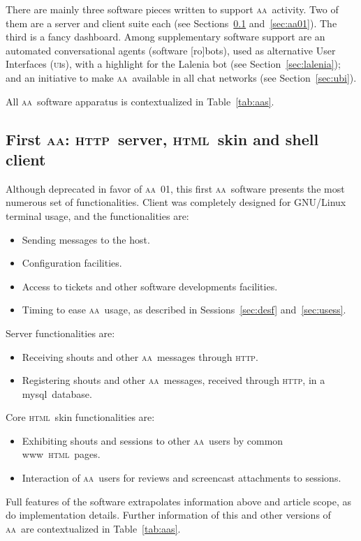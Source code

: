 \documentclass[a4paper, 11pt]{article} %
\newcommand{\httpb}{\textsc{http}}
\newcommand{\html}{\textsc{html}}
\newcommand{\aab}{\textsc{aa}}
\newcommand{\www}{{\sc www}}
\newcommand{\mysql}{{\sc m}y{\sc sql}}
\newcommand{\ui}{\textsc{ui}}
\begin{document}
There are mainly three software pieces written to support \aab\ activity. Two of them are a server and client suite each (see Sections~\ref{sec:aaFirst} and~\ref{sec:aa01}). The third is a fancy dashboard. Among supplementary software support are an automated conversational agents (software [ro]bots), used as alternative User Interfaces (\ui s), with a highlight for the Lalenia bot (see Section~\ref{sec:lalenia}); and an initiative to make \aab\ available in all chat networks (see Section~\ref{sec:ubi}).

All \aab\ software apparatus is contextualized in Table~\ref{tab:aas}.

\subsection{First \aab: \httpb\ server, \html\ skin and shell client}\label{sec:aaFirst}
Although deprecated in favor of \aab\ 01, this first \aab\ software presents the most numerous set of functionalities. Client was completely designed for GNU/Linux terminal usage, and the  functionalities are:
\begin{itemize}
    \item Sending messages to the host.
    \item Configuration facilities.
    \item Access to tickets and other software developments facilities.
    \item Timing to ease \aab\ usage, as described in Sessions~\ref{sec:desf} and~\ref{sec:usess}.
\end{itemize}

Server functionalities are:
\begin{itemize}
    \item Receiving shouts and other \aab\ messages through \httpb.
    \item Registering shouts and other \aab\ messages, received through \httpb, in a \mysql\ database.
\end{itemize}

Core \html\ skin functionalities are:
\begin{itemize}
    \item Exhibiting shouts and sessions to other \aab\ users by common \www\ \html\ pages.
    \item Interaction of \aab\ users for reviews and screencast attachments to sessions.
\end{itemize}

Full features of the software extrapolates information above and article scope, as do implementation details. Further information of this and other versions of \aab\ are contextualized in Table~\ref{tab:aas}.
\end{document}
